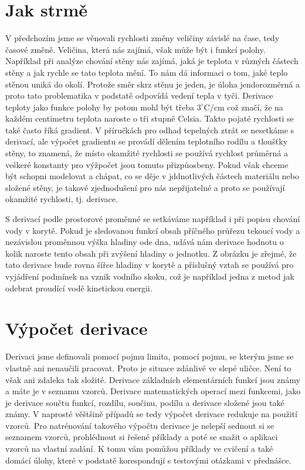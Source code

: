 \documentclass[12pt]{article}
\begin{document}
\newpage
\section*{Jak strmě}

V předchozím jsme se věnovali rychlosti změny veličiny závislé na čase, tedy časové změně. Veličina, která nás zajímá, však může být i funkcí polohy. Například při analýze chování stěny nás zajímá, jaká je teplota v různých částech stěny a jak rychle se tato teplota mění. To nám dá informaci o tom, jaké teplo stěnou uniká do okolí. Protože směr skrz stěnu je jeden, je úloha jendorozměrná a proto tato problematika v podstatě odpovídá vedení tepla v tyči. Derivace teploty jako funkce polohy by potom mohl být třeba $3 ^\circ\mathrm{C}/\mathrm{cm}$ což značí, že na každém centimetru teplota naroste o tři stupně Celsia. Takto pojaté rychlosti se také často říká gradient. V příručkách pro odhad tepelných ztrát se nesetkáme s derivací, ale výpočet gradientu se provádí dělením teplotního rodílu a tloušťky stěny, to znamená, že místo okamžité rychlosti se používá rychlost průměrná a veškeré konstanty pro výžpočet jsou tomuto přizpůosbeny. Pokud však chceme být schopni modelovat a chápat, co se děje v jddnotlivých částech materiálu nebo složené stěny, je takové zjednodušení pro nás nepřijatelné a proto se používají okamžité rychlosti, tj. derivace.

S derivací podle prostorové proměnné se setkáváme například i při popisu chování vody v korytě. Pokud je sledovanou funkcí obsah příčného průřezu tekoucí vody a nezávislou proměnnou výška hladiny ode dna, udává nám derivace hodnotu o kolik naroste tento obsah při zvýšení hladiny o jednotku. Z obrázku je zřejmé, že tato derivace bude rovna šířce hladiny v korytě a příslušný vztah se používá pro vyjádření podmínek na vznik vodního skoku, což je například jedna z metod jak odebrat proudící vodě kinetickou energii.

\newpage

\section*{Výpočet derivace}

Derivaci jsme definovali pomocí pojmu limita, pomocí pojmu, se kterým jsme se vlastně ani nenaučili pracovat. Proto je situace zdánlivě ve slepé uličce. Není to však ani zdaleka tak složité. Derivace základních elementárních funkcí jsou známy a máte je v seznamu vzorců. Derivace matematických operací mezi funkcemi, jako je derivace součtu funkcí, rozdílu, součinu, podílu a derivace složené jsou také známy. V naprosté věštšině případů se tedy výpočet derivace redukuje na použití vzorců. Pro natrénování takového výpočtu derivace je nelepší sednout si se seznamem vzorců, prohlédnout si řešené příklady a poté se snažit o aplikaci vzorců na vlastní zadání. K tomu vám pomůžou příklady ve cvičení a také domácí úlohy, které v podstatě korespondují s testovými otázkami v přednášce.
\end{document}
